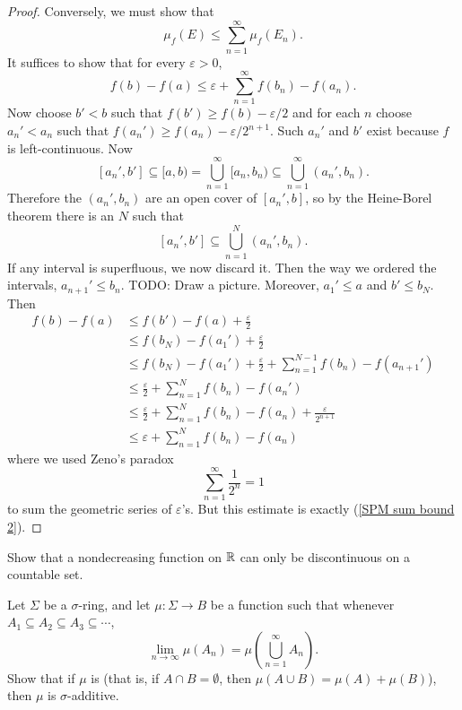 \begin{proof}
Conversely, we must show that
\[\mu_f(E) \leq \sum_{n=1}^\infty \mu_f(E_n).\]
It suffices to show that for every $\varepsilon > 0$,
\begin{equation}
\label{SPM sum bound 2}
f(b) - f(a) \leq \varepsilon + \sum_{n=1}^\infty f(b_n) - f(a_n).
\end{equation}
Now choose $b' < b$ such that $f(b') \geq f(b) - \varepsilon/2$ and for each $n$ choose $a_n' < a_n$ such that $f(a_n') \geq f(a_n) - \varepsilon/2^{n+1}$.
Such $a_n'$ and $b'$ exist because $f$ is left-continuous.
Now
\[[a_n', b'] \subseteq [a, b) = \bigcup_{n=1}^\infty [a_n, b_n) \subseteq \bigcup_{n=1}^\infty (a_n', b_n).\]
Therefore the $(a_n', b_n)$ are an open cover of $[a_n', b]$, so by the Heine-Borel theorem there is an $N$ such that
\[[a_n', b'] \subseteq \bigcup_{n=1}^N (a_n', b_n).\]
If any interval is superfluous, we now discard it.
Then the way we ordered the intervals, $a_{n+1}' \leq b_n$.
TODO: Draw a picture.
Moreover, $a_1' \leq a$ and $b' \leq b_N$. Then
\begin{align*}
f(b) - f(a) &\leq f(b') - f(a) + \frac{\varepsilon}{2}\\
& \leq f(b_N) - f(a_1') + \frac{\varepsilon}{2}\\
& \leq f(b_N) - f(a_1') + \frac{\varepsilon}{2} + \sum_{n=1}^{N-1} f(b_n) - f(a_{n+1}')\\
& \leq \frac{\varepsilon}{2} + \sum_{n=1}^N f(b_n) - f(a_n')\\
& \leq \frac{\varepsilon}{2} + \sum_{n=1}^N f(b_n) - f(a_n) + \frac{\varepsilon}{2^{n+1}}\\
& \leq \varepsilon + \sum_{n=1}^N f(b_n) - f(a_n)
\end{align*}
where we used Zeno's paradox
\begin{equation}
\label{zeno}
\sum_{n=1}^\infty \frac{1}{2^n} = 1
\end{equation}
to sum the geometric series of $\varepsilon$'s.
But this estimate is exactly (\ref{SPM sum bound 2}).
\end{proof}

\begin{exercise}
\label{nondecreasing exercise}
Show that a nondecreasing function on $\mathbb{R}$ can only be discontinuous on a countable set.
\end{exercise}

\begin{exercise}
Let $\Sigma$ be a $\sigma$-ring, and let $\mu: \Sigma \to B$ be a function such that whenever $A_1 \subseteq A_2 \subseteq A_3 \subseteq \cdots$,
\[\lim_{n \to \infty} \mu(A_n) = \mu\left(\bigcup_{n=1}^\infty A_n\right).\]
Show that if $\mu$ is  (that is, if $A \cap B = \emptyset$, then $\mu(A \cup B) = \mu(A) + \mu(B)$), then $\mu$ is $\sigma$-additive.
\end{exercise}

